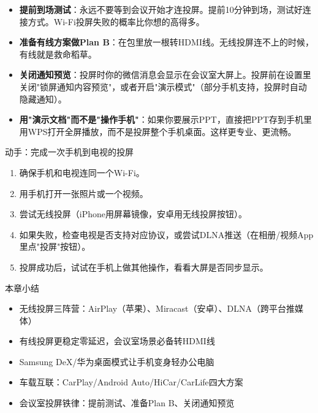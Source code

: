 \begin{itemize}
  \item \textbf{提前到场测试}：永远不要等到会议开始才连投屏。提前10分钟到场，测试好连接方式。Wi-Fi投屏失败的概率比你想的高得多。
  \item \textbf{准备有线方案做Plan B}：在包里放一根转HDMI线。无线投屏连不上的时候，有线就是救命稻草。
  \item \textbf{关闭通知预览}：投屏时你的微信消息会显示在会议室大屏上。投屏前在设置里关闭"锁屏通知内容预览"，或者开启"演示模式"（部分手机支持，投屏时自动隐藏通知）。
  \item \textbf{用"演示文档"而不是"操作手机"}：如果你要展示PPT，直接把PPT存到手机里用WPS打开全屏播放，而不是投屏整个手机桌面。这样更专业、更流畅。
\end{itemize}

\begin{tcbpractice}{动手：完成一次手机到电视的投屏}
\begin{enumerate}
  \item 确保手机和电视连同一个Wi-Fi。
  \item 用手机打开一张照片或一个视频。
  \item 尝试无线投屏（iPhone用屏幕镜像，安卓用无线投屏按钮）。
  \item 如果失败，检查电视是否支持对应协议，或尝试DLNA推送（在相册/视频App里点"投屏"按钮）。
  \item 投屏成功后，试试在手机上做其他操作，看看大屏是否同步显示。
\end{enumerate}

\end{tcbpractice}

\begin{tcbsummary}{本章小结}
\begin{itemize}
  \item 无线投屏三阵营：AirPlay（苹果）、Miracast（安卓）、DLNA（跨平台推媒体）
  \item 有线投屏更稳定零延迟，会议室场景必备转HDMI线
  \item Samsung DeX/华为桌面模式让手机变身轻办公电脑
  \item 车载互联：CarPlay/Android Auto/HiCar/CarLife四大方案
  \item 会议室投屏铁律：提前测试、准备Plan B、关闭通知预览
\end{itemize}

\end{tcbsummary}
